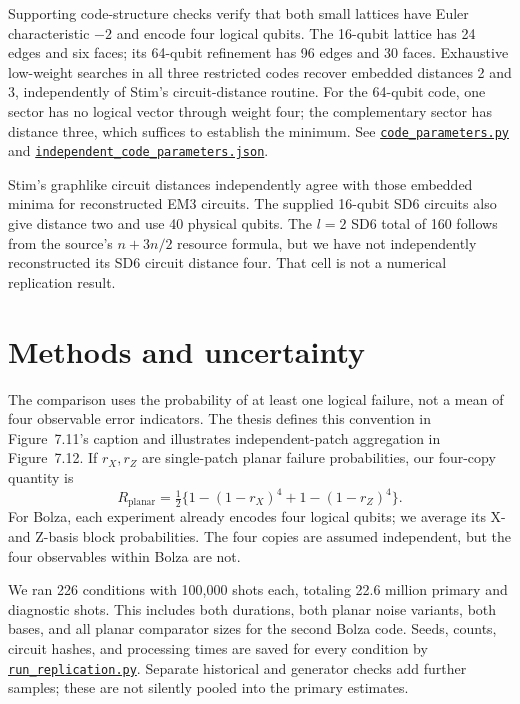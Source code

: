 \documentclass[11pt]{article}
\newcommand{\file}[2]{\href{https://github.com/alectionary/vibe-math/blob/master/formalization/higgott-quantum-decoding/#1}{\nolinkurl{#2}}}
\begin{document}
Supporting code-structure checks verify that both small lattices have Euler characteristic $-2$ and encode four logical qubits. The 16-qubit lattice has 24 edges and six faces; its 64-qubit refinement has 96 edges and 30 faces. Exhaustive low-weight searches in all three restricted codes recover embedded distances 2 and 3, independently of Stim's circuit-distance routine. For the 64-qubit code, one sector has no logical vector through weight four; the complementary sector has distance three, which suffices to establish the minimum. See \file{code_parameters.py}{code_parameters.py} and \file{provenance/independent_code_parameters.json}{independent_code_parameters.json}.

Stim's graphlike circuit distances independently agree with those embedded minima for reconstructed EM3 circuits. The supplied 16-qubit SD6 circuits also give distance two and use 40 physical qubits. The $l=2$ SD6 total of 160 follows from the source's $n+3n/2$ resource formula, but we have not independently reconstructed its SD6 circuit distance four. That cell is not a numerical replication result.

\section{Methods and uncertainty}
The comparison uses the probability of at least one logical failure, not a mean of four observable error indicators. The thesis defines this convention in Figure~7.11's caption and illustrates independent-patch aggregation in Figure~7.12. If $r_X,r_Z$ are single-patch planar failure probabilities, our four-copy quantity is
\[
 R_{\mathrm{planar}}=\tfrac12\{1-(1-r_X)^4+1-(1-r_Z)^4\}.
\]
For Bolza, each experiment already encodes four logical qubits; we average its X- and Z-basis block probabilities. The four copies are assumed independent, but the four observables within Bolza are not.

We ran 226 conditions with 100,000 shots each, totaling 22.6 million primary and diagnostic shots. This includes both durations, both planar noise variants, both bases, and all planar comparator sizes for the second Bolza code. Seeds, counts, circuit hashes, and processing times are saved for every condition by \file{run_replication.py}{run_replication.py}. Separate historical and generator checks add further samples; these are not silently pooled into the primary estimates.
\end{document}
